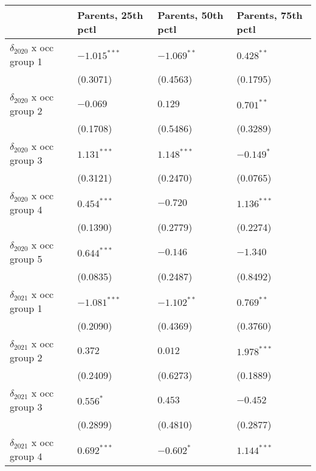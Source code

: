 \begin{tabular}{llll}
\toprule
{} & Parents, 25th pctl & Parents, 50th pctl & Parents, 75th pctl \\
\midrule
$\delta_{2020}$ x occ group 1          &     $-1.015^{***}$ &      $-1.069^{**}$ &       $0.428^{**}$ \\
                                       &           (0.3071) &           (0.4563) &           (0.1795) \\
$\delta_{2020}$ x occ group 2          &           $-0.069$ &            $0.129$ &       $0.701^{**}$ \\
                                       &           (0.1708) &           (0.5486) &           (0.3289) \\
$\delta_{2020}$ x occ group 3          &      $1.131^{***}$ &      $1.148^{***}$ &         $-0.149^*$ \\
                                       &           (0.3121) &           (0.2470) &           (0.0765) \\
$\delta_{2020}$ x occ group 4          &      $0.454^{***}$ &           $-0.720$ &      $1.136^{***}$ \\
                                       &           (0.1390) &           (0.2779) &           (0.2274) \\
$\delta_{2020}$ x occ group 5          &      $0.644^{***}$ &           $-0.146$ &           $-1.340$ \\
                                       &           (0.0835) &           (0.2487) &           (0.8492) \\
$\delta_{2021}$ x occ group 1          &     $-1.081^{***}$ &      $-1.102^{**}$ &       $0.769^{**}$ \\
                                       &           (0.2090) &           (0.4369) &           (0.3760) \\
$\delta_{2021}$ x occ group 2          &            $0.372$ &            $0.012$ &      $1.978^{***}$ \\
                                       &           (0.2409) &           (0.6273) &           (0.1889) \\
$\delta_{2021}$ x occ group 3          &          $0.556^*$ &            $0.453$ &           $-0.452$ \\
                                       &           (0.2899) &           (0.4810) &           (0.2877) \\
$\delta_{2021}$ x occ group 4          &      $0.692^{***}$ &         $-0.602^*$ &      $1.144^{***}$ \\

\end{tabular}
